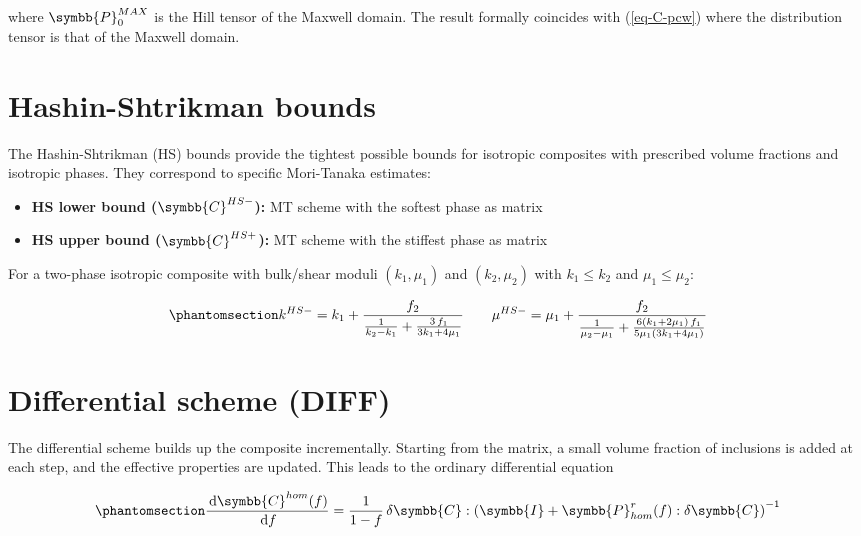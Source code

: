 \documentclass[
  a4paper,
  numbers=noendperiod,
  DIV=12]{scrreprt}
\providecommand{\tightlist}{%
  \setlength{\itemsep}{0pt}\setlength{\parskip}{0pt}}
\newcommand{\uuuu}[1]{{\symbb{{#1}}}}
\newcommand{\ud}{{\,\mathrm{d}}}
\begin{document}
where \(\uuuu{P}_0^{MAX}\) is the Hill tensor of the Maxwell domain. The
result formally coincides with (\ref{eq-C-pcw}) where the distribution
tensor is that of the Maxwell domain.

\section{Hashin-Shtrikman bounds}\label{sec-hs-bounds}

The Hashin-Shtrikman (HS) bounds provide the tightest possible bounds
for isotropic composites with prescribed volume fractions and isotropic
phases. They correspond to specific Mori-Tanaka estimates:

\begin{itemize}
\tightlist
\item
  \textbf{HS lower bound (\(\uuuu{C}^{HS-}\)):} MT scheme with the
  softest phase as matrix
\item
  \textbf{HS upper bound (\(\uuuu{C}^{HS+}\)):} MT scheme with the
  stiffest phase as matrix
\end{itemize}

For a two-phase isotropic composite with bulk/shear moduli
\((k_1,\mu_1)\) and \((k_2,\mu_2)\) with \(k_1 \leq k_2\) and
\(\mu_1 \leq \mu_2\):

\begin{equation}\protect\phantomsection\label{eq-HS-bounds}{
k^{HS-} = k_1 + \frac{f_2}{\frac{1}{k_2 - k_1} + \frac{3\,f_1}{3k_1+4\mu_1}}
\qquad
\mu^{HS-} = \mu_1 + \frac{f_2}{\frac{1}{\mu_2-\mu_1} + \frac{6(k_1+2\mu_1)\,f_1}{5\mu_1(3k_1+4\mu_1)}}
}\end{equation}

\section{Differential scheme (DIFF)}\label{sec-diff-deriv}

The differential scheme builds up the composite incrementally. Starting
from the matrix, a small volume fraction of inclusions is added at each
step, and the effective properties are updated. This leads to the
ordinary differential equation

\begin{equation}\protect\phantomsection\label{eq-diff-ode}{
\frac{\ud\uuuu{C}^{hom}(f)}{\ud f} = \frac{1}{1-f} \, \delta\uuuu{C} : \left(\uuuu{I} + \uuuu{P}_{hom}^r(f) : \delta\uuuu{C}\right)^{-1}
}\end{equation}
\end{document}
